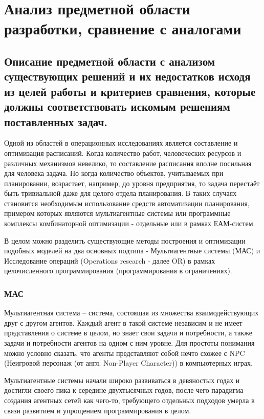 \section{Анализ предметной области разработки, сравнение с аналогами}

\subsection{Описание предметной области с анализом существующих решений и их недостатков исходя из целей работы и критериев сравнения, которые должны соответствовать искомым решениям поставленных задач.}
Одной из областей в операционных исследованиях является составление и оптимизация расписаний. Когда количество работ, человеческих ресурсов и различных механизмов невелико, то составление расписания вполне посильная для человека задача. Но когда количество объектов, учитываемых при планировании, возрастает, например, до уровня предприятия, то задача перестаёт быть тривиальной даже для целого отдела планирования. В таких случаях становится необходимым использование средств автоматизации планирования, примером которых являются мультиагентные системы или программные комплексы комбинаторной оптимизации - отдельные или в рамках ЕАМ-систем.

В целом можно разделить существующие методы построения и оптимизации подобных моделей на два основных подтипа - Мультиагентные системы (МАС) и Исследование операций (Operations research - далее OR) в рамках целочисленного программирования (программирования в ограничениях).

\subsubsection{МАС}

Мультиагентная система – система, состоящая из множества взаимодействующих друг с другом агентов. Каждый агент в такой системе независим и не имеет представления о системе в целом, но знает свои задачи и потребности, а также задачи и потребности агентов на одном с ним уровне. Для простоты понимания можно условно сказать, что агенты представляют собой нечто схожее с NPC (Неигровой персонаж (от англ. Non-Player Character)) в компьютерных играх. 

Мультиагентные системы начали широко развиваться в девяностых годах и достигли своего пика к середине двухтысячных годов, после чего парадигма создания агентных сетей как чего-то, требующего отдельных подходов умерла в связи развитием и упрощением программирования в целом.

